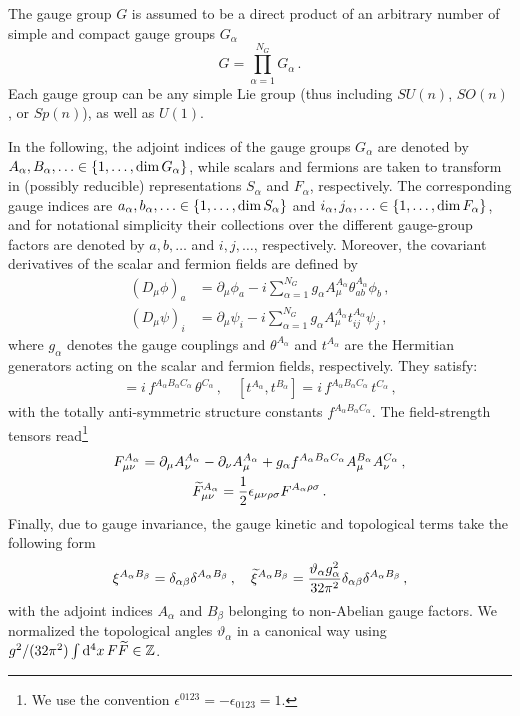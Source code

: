 The gauge group $G$ is assumed to be a direct product of an arbitrary number of simple and compact gauge groups $G_\alpha$
\begin{equation}
    G = \prod_{\alpha=1}^{N_G} G_\alpha\,.
    \label{eq:full_gauge_group}
\end{equation}
Each gauge group can be any simple Lie group (thus including $SU(n)$, $SO(n)$, or $Sp(n)$), as well as $U(1)$.

In the following, the adjoint indices of the gauge groups $G_\alpha$ are denoted by $A_\alpha,B_\alpha,\dotsc \in \{1,\dotsc,\operatorname*{\text{dim}} G_\alpha\}$,
while scalars and fermions are taken to transform in (possibly reducible) representations $S_\alpha$ and $F_\alpha$, respectively. 
The corresponding gauge indices are
$a_{\alpha},b_{\alpha},\dotsc \in \{1,\dotsc,\operatorname*{\text{dim}} S_{\alpha}\}$ and $i_\alpha,j_\alpha,\dotsc \in \{1,\dotsc,\operatorname*{\text{dim}} F_{\alpha}\}$, and for notational simplicity their collections over the different gauge-group factors are denoted by $a,b,\dotsc$ and $i,j,\dotsc$, respectively.
Moreover, the covariant derivatives of the scalar and fermion fields are defined by
\begin{align}
    (D_\mu\phi)_{a} &= \partial_\mu\phi_{a} -i\sum_{\alpha=1}^{N_G} g_\alpha A^{A_\alpha}_\mu \theta^{A_\alpha}_{ab}\phi_{b}\,,\label{eq:cov_der_phi} \\
    (D_\mu\psi)_{i} &= \partial_\mu\psi_{i} -i\sum_{\alpha=1}^{N_G} g_\alpha A^{A_\alpha}_\mu t^{A_\alpha}_{ij}\psi_{j}\label{eq:cov_der_psi}\,,
\end{align}
where $g_\alpha$ denotes the gauge couplings and $\theta^{A_\alpha}$ and $t^{A_\alpha}$ are the Hermitian generators acting on the scalar and fermion fields, respectively. They satisfy: 
\begin{gather}
    [\theta^{A_\alpha},\theta^{B_\alpha}] = i\, f^{A_\alpha B_\alpha C_\alpha}\,\theta^{C_\alpha} \,, \quad
    [t^{A_\alpha},t^{B_\alpha}] = i\, f^{A_\alpha B_\alpha C_\alpha}\,t^{C_\alpha} \,,
\end{gather}
%
with the totally anti-symmetric structure constants $f^{A_\alpha B_\alpha C_\alpha}$. The field-strength tensors read\footnote{We use the convention $\epsilon^{0123} =-\epsilon_{0123}= 1$.}
\begin{gather}
    F^{A_\alpha}_{\mu\nu}=\partial_\mu A^{A_\alpha}_\nu - \partial_\nu A^{A_\alpha}_\mu + g_\alpha f^{A_\alpha B_\alpha C_\alpha}A^{B_\alpha}_\mu A^{C_\alpha}_\nu\,,\label{eq:field_strength}\\
    \widetilde{F}^{A_\alpha}_{\mu\nu}= \frac{1}{2}\epsilon_{\mu\nu\rho\sigma}  F^{A_\alpha\rho\sigma}\,.
\end{gather}
%
Finally, due to gauge invariance, the gauge kinetic and topological terms take the following form
\begin{equation}
\xi^{A_\alpha B_\beta} = \delta_{\alpha\beta}\delta^{A_\alpha B_\beta}\,,\quad \widetilde{\xi}^{A_\alpha B_\beta} = \frac{\vartheta_\alpha g_\alpha^2}{32\pi^2} \delta_{\alpha\beta}\delta^{A_\alpha B_\beta} \,,
\end{equation}
with the adjoint indices $A_\alpha$ and $B_\beta$ belonging to non-Abelian gauge factors. 
We normalized the topological angles $\vartheta_\alpha$ in a canonical way using $g^2/(32\pi^2) \int \dd^4x\, F \widetilde{F} \in \mathbb{Z}$.

